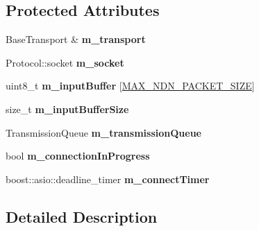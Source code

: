 \subsection*{Protected Attributes}
\begin{DoxyCompactItemize}
\item 
Base\+Transport \& {\bfseries m\+\_\+transport}\hypertarget{classndn_1_1StreamTransportImpl_ab2df0f9bde365006e96f2f2c157351d6}{}\label{classndn_1_1StreamTransportImpl_ab2df0f9bde365006e96f2f2c157351d6}

\item 
Protocol\+::socket {\bfseries m\+\_\+socket}\hypertarget{classndn_1_1StreamTransportImpl_a17a3dd00745aafffa42b6224518ad9f6}{}\label{classndn_1_1StreamTransportImpl_a17a3dd00745aafffa42b6224518ad9f6}

\item 
uint8\+\_\+t {\bfseries m\+\_\+input\+Buffer} \mbox{[}\hyperlink{namespacendn_a8117ecf631e92bab09eb41b92ac9b2b6}{M\+A\+X\+\_\+\+N\+D\+N\+\_\+\+P\+A\+C\+K\+E\+T\+\_\+\+S\+I\+ZE}\mbox{]}\hypertarget{classndn_1_1StreamTransportImpl_ab5332373a5beda15055259347db4bb5b}{}\label{classndn_1_1StreamTransportImpl_ab5332373a5beda15055259347db4bb5b}

\item 
size\+\_\+t {\bfseries m\+\_\+input\+Buffer\+Size}\hypertarget{classndn_1_1StreamTransportImpl_a1189d8fa8756641f76ab9231ccf5dc9f}{}\label{classndn_1_1StreamTransportImpl_a1189d8fa8756641f76ab9231ccf5dc9f}

\item 
Transmission\+Queue {\bfseries m\+\_\+transmission\+Queue}\hypertarget{classndn_1_1StreamTransportImpl_ab154e2c774a5af9049acb6d0e70e178e}{}\label{classndn_1_1StreamTransportImpl_ab154e2c774a5af9049acb6d0e70e178e}

\item 
bool {\bfseries m\+\_\+connection\+In\+Progress}\hypertarget{classndn_1_1StreamTransportImpl_a5d0946f8c9bb739e4cf895b8faabeaf9}{}\label{classndn_1_1StreamTransportImpl_a5d0946f8c9bb739e4cf895b8faabeaf9}

\item 
boost\+::asio\+::deadline\+\_\+timer {\bfseries m\+\_\+connect\+Timer}\hypertarget{classndn_1_1StreamTransportImpl_ab14cd2f94d3547933ca98e1396fc6d1d}{}\label{classndn_1_1StreamTransportImpl_ab14cd2f94d3547933ca98e1396fc6d1d}

\end{DoxyCompactItemize}


\subsection{Detailed Description}
